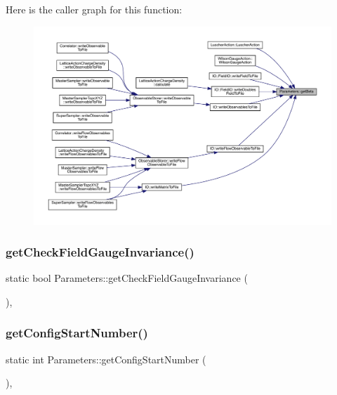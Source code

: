 Here is the caller graph for this function\+:\nopagebreak
\begin{figure}[H]
\begin{center}
\leavevmode
\includegraphics[width=350pt]{class_parameters_ae5c64523dc50dca13b417fe3d9e4175c_icgraph}
\end{center}
\end{figure}
\mbox{\label{class_parameters_a2563b9474acd87cf4a350f488c71339f}} 
\subsubsection{\texorpdfstring{getCheckFieldGaugeInvariance()}{getCheckFieldGaugeInvariance()}}
{\footnotesize\ttfamily static bool Parameters\+::get\+Check\+Field\+Gauge\+Invariance (\begin{DoxyParamCaption}{ }\end{DoxyParamCaption})\hspace{0.3cm}{\ttfamily [inline]}, {\ttfamily [static]}}

\mbox{\label{class_parameters_a58f15668b37e705d34d6588e287e4bc0}} 
\subsubsection{\texorpdfstring{getConfigStartNumber()}{getConfigStartNumber()}}
{\footnotesize\ttfamily static int Parameters\+::get\+Config\+Start\+Number (\begin{DoxyParamCaption}{ }\end{DoxyParamCaption})\hspace{0.3cm}{\ttfamily [inline]}, {\ttfamily [static]}}

